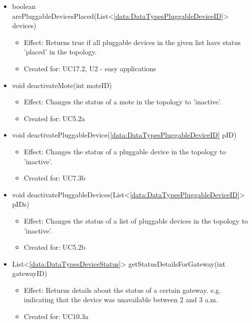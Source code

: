 \begin{description}
\begin{itemize}[noitemsep,nolistsep,leftmargin=-.25cm]
\begin{itemize}
        \end{itemize}
      \item \textsf{boolean arePluggableDevicesPlaced(List\textless{}\ref{data:DataTypesPluggableDeviceID}\textgreater{} devices)}
        \begin{itemize}[noitemsep,nolistsep]
           \item Effect: Returns true if all pluggable devices in the given list have status 'placed' in the topology.
\item Created for: UC17.2, U2 - easy applications
        \end{itemize}
      \item \textsf{void deactivateMote(int moteID)}
        \begin{itemize}[noitemsep,nolistsep]
           \item Effect: Changes the status of a mote in the topology to 'inactive'.
\item Created for: UC5.2a
        \end{itemize}
      \item \textsf{void deactivatePluggableDevice(\ref{data:DataTypesPluggableDeviceID} pID)}
        \begin{itemize}[noitemsep,nolistsep]
           \item Effect: Changes the status of a pluggable device in the topology to 'inactive'.
\item Created for: UC7.3b
        \end{itemize}
      \item \textsf{void deactivatePluggableDevices(List\textless{}\ref{data:DataTypesPluggableDeviceID}\textgreater{} pIDs)}
        \begin{itemize}[noitemsep,nolistsep]
           \item Effect: Changes the status of a list of pluggable devices in the topology to 'inactive'.
\item Created for: UC5.2b
        \end{itemize}
      \item \textsf{List\textless{}\ref{data:DataTypesDeviceStatus}\textgreater{} getStatusDetailsForGateway(int gatewayID)}
        \begin{itemize}[noitemsep,nolistsep]
           \item Effect: Returns details about the status of a certain gateway. e.g. indicating that the device was unavailable between 2 and 3 a.m.
\item Created for: UC10.3a
        \end{itemize}

\end{itemize}
\end{description}
